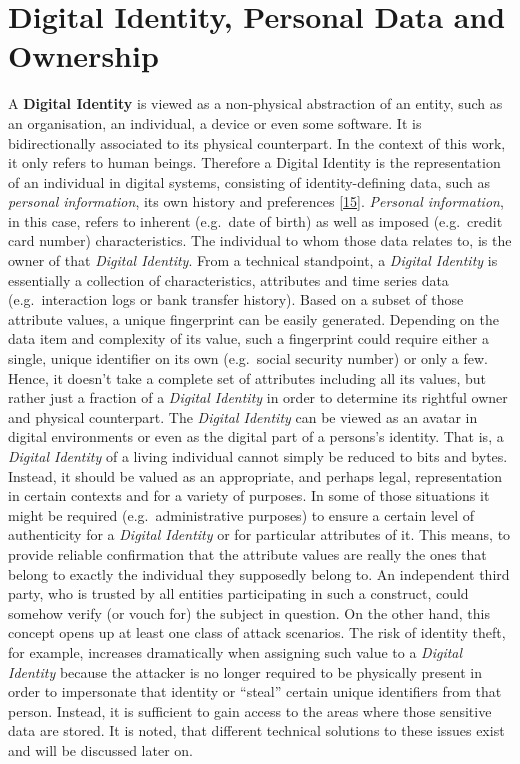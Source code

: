 \documentclass[12pt,english,a4paper,titlepage,cleardoublepage=empty,dottedtoc]{report}
\begin{document}
\hypertarget{digital-identity-personal-data-and-ownership}{\section{Digital
Identity, Personal Data and
Ownership}\label{digital-identity-personal-data-and-ownership}}

A \textbf{\protect\hypertarget{def--digital-identity}{}{Digital
Identity}} is viewed as a non-physical abstraction of an entity, such as
an organisation, an individual, a device or even some software. It is
bidirectionally associated to its physical counterpart. In the context
of this work, it only refers to human beings. Therefore a Digital
Identity is the representation of an individual in digital systems,
consisting of identity-defining data, such as \emph{personal
information}, its own history and preferences
{[}\protect\hyperlink{ref-whitepaper_2012_the-value-of-our-digital-identity_definition}{15}{]}.
\emph{Personal information}, in this case, refers to inherent (e.g.~date
of birth) as well as imposed (e.g.~credit card number) characteristics.
The individual to whom those data relates to, is the owner of that
\emph{Digital Identity}. From a technical standpoint, a \emph{Digital
Identity} is essentially a collection of characteristics, attributes and
time series data (e.g.~interaction logs or bank transfer history). Based
on a subset of those attribute values, a unique fingerprint can be
easily generated. Depending on the data item and complexity of its
value, such a fingerprint could require either a single, unique
identifier on its own (e.g.~social security number) or only a few.
Hence, it doesn't take a complete set of attributes including all its
values, but rather just a fraction of a \emph{Digital Identity} in order
to determine its rightful owner and physical counterpart. The
\emph{Digital Identity} can be viewed as an avatar in digital
environments or even as the digital part of a persons's identity. That
is, a \emph{Digital Identity} of a living individual cannot simply be
reduced to bits and bytes. Instead, it should be valued as an
appropriate, and perhaps legal, representation in certain contexts and
for a variety of purposes. In some of those situations it might be
required (e.g.~administrative purposes) to ensure a certain level of
authenticity for a \emph{Digital Identity} or for particular attributes
of it. This means, to provide reliable confirmation that the attribute
values are really the ones that belong to exactly the individual they
supposedly belong to. An independent third party, who is trusted by all
entities participating in such a construct, could somehow verify (or
vouch for) the subject in question. On the other hand, this concept
opens up at least one class of attack scenarios. The risk of identity
theft, for example, increases dramatically when assigning such value to
a \emph{Digital Identity} because the attacker is no longer required to
be physically present in order to impersonate that identity or ``steal''
certain unique identifiers from that person. Instead, it is sufficient
to gain access to the areas where those sensitive data are stored. It is
noted, that different technical solutions to these issues exist and will
be discussed later on.
\end{document}
